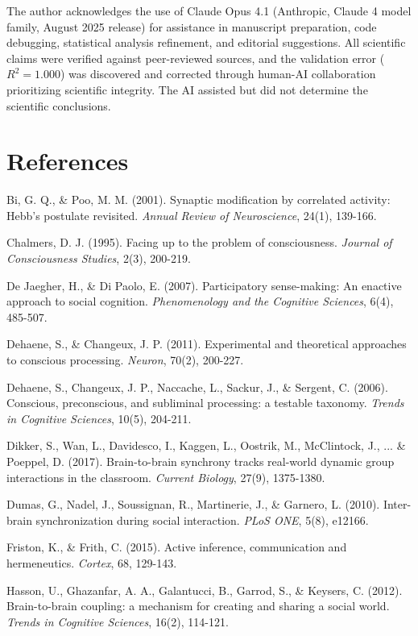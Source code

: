 \documentclass[12pt]{article}
\begin{document}
The author acknowledges the use of Claude Opus 4.1 (Anthropic, Claude 4 model family, August 2025 release) for assistance in manuscript preparation, code debugging, statistical analysis refinement, and editorial suggestions. All scientific claims were verified against peer-reviewed sources, and the validation error ($R^2=1.000$) was discovered and corrected through human-AI collaboration prioritizing scientific integrity. The AI assisted but did not determine the scientific conclusions.

\section*{References}

Bi, G. Q., \& Poo, M. M. (2001). Synaptic modification by correlated activity: Hebb's postulate revisited. \textit{Annual Review of Neuroscience}, 24(1), 139-166.

Chalmers, D. J. (1995). Facing up to the problem of consciousness. \textit{Journal of Consciousness Studies}, 2(3), 200-219.

De Jaegher, H., \& Di Paolo, E. (2007). Participatory sense-making: An enactive approach to social cognition. \textit{Phenomenology and the Cognitive Sciences}, 6(4), 485-507.

Dehaene, S., \& Changeux, J. P. (2011). Experimental and theoretical approaches to conscious processing. \textit{Neuron}, 70(2), 200-227.

Dehaene, S., Changeux, J. P., Naccache, L., Sackur, J., \& Sergent, C. (2006). Conscious, preconscious, and subliminal processing: a testable taxonomy. \textit{Trends in Cognitive Sciences}, 10(5), 204-211.

Dikker, S., Wan, L., Davidesco, I., Kaggen, L., Oostrik, M., McClintock, J., ... \& Poeppel, D. (2017). Brain-to-brain synchrony tracks real-world dynamic group interactions in the classroom. \textit{Current Biology}, 27(9), 1375-1380.

Dumas, G., Nadel, J., Soussignan, R., Martinerie, J., \& Garnero, L. (2010). Inter-brain synchronization during social interaction. \textit{PLoS ONE}, 5(8), e12166.

Friston, K., \& Frith, C. (2015). Active inference, communication and hermeneutics. \textit{Cortex}, 68, 129-143.

Hasson, U., Ghazanfar, A. A., Galantucci, B., Garrod, S., \& Keysers, C. (2012). Brain-to-brain coupling: a mechanism for creating and sharing a social world. \textit{Trends in Cognitive Sciences}, 16(2), 114-121.
\end{document}
